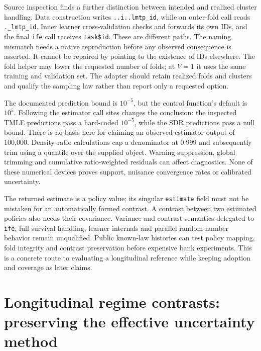 Source inspection finds a further distinction between intended and realized
cluster handling. Data construction writes \texttt{..i..lmtp\_id}, while an
outer-fold call reads \texttt{.\_lmtp\_id}. Inner learner cross-validation
checks and forwards its own IDs, and the final \texttt{ife} call receives
\texttt{task\$id}. These are different paths. The naming mismatch needs a
native reproduction before any observed consequence is asserted. It cannot
be repaired by pointing to the existence of IDs elsewhere. The fold helper
may lower the requested number of folds; at $V=1$ it uses the same training
and validation set. The adapter should retain realized folds and clusters
and qualify the sampling law rather than report only a requested option.

The documented prediction bound is $10^{-5}$, but the control function's
default is $10^5$. Following the estimator call sites changes the conclusion:
the inspected TMLE predictions pass a hard-coded $10^{-5}$, while the SDR
predictions pass a null bound. There is no basis here for claiming an observed
estimator output of 100,000. Density-ratio calculations cap a denominator at
0.999 and subsequently trim using a quantile over the supplied object.
Warning suppression, global trimming and cumulative ratio-weighted residuals
can affect diagnostics. None of these numerical devices proves support,
nuisance convergence rates or calibrated uncertainty.
\citep{exec22_lmtp_reuse}

The returned estimate is a policy value; its singular \texttt{estimate} field
must not be mistaken for an automatically formed contrast. A contrast between
two estimated policies also needs their covariance. Variance and contrast
semantics delegated to \texttt{ife}, full survival handling, learner internals
and parallel random-number behavior remain unqualified. Public known-law
histories can test policy mapping, fold integrity and contrast preservation
before expensive bank experiments. This is a concrete route to evaluating a
longitudinal reference while keeping adoption and coverage as later claims.


\section{Longitudinal regime contrasts: preserving the effective uncertainty method}
\label{exec23:ltmle-regimes}

